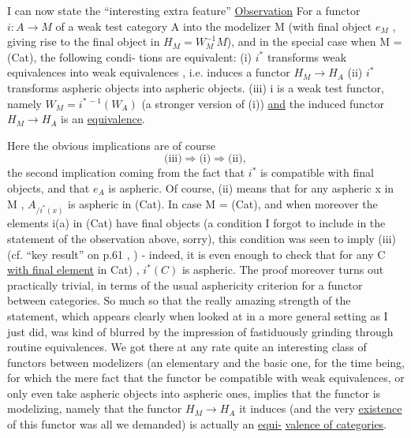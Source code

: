 
I can now state the ``interesting extra feature'' 
\uline{Observation} For a functor $i: A\to M$ of a weak test category A into the
modelizer M (with final object $e_M$ , giving rise to the final object in
$H_M = W_M^{-1}M$), and in the special case when M = (Cat), the following condi-%
tions are equivalent:
(i) $i^*$ transforms weak equivalences into weak equivalences , i.e.
induces a functor  $H_M\to H_{A\hat{}}$
(ii) $i^*$ transforms aspheric objects into aspheric objects.
(iii) i is a weak test functor, namely $W_M = i^{*\,-1}(W_{A\hat{}})$ (a stronger
version of (i)) \uline{and} the induced functor $H_M\to H_{A\hat{}}$ is an
\uline{equivalence}.

Here the obvious implications are of course
\[ \text{(iii)} \Longrightarrow \text{(i)} \Longrightarrow \text{(ii)} , \]
the second implic\hand{\unsure{$\smile$}}ation coming from the fact that $i^*$ is compatible with
final objects, and that $e_{A\hat{}}$ is aspheric. Of course, (ii) means that
for any aspheric x in M , $A_{/i^*(x)}$ is aspheric in (Cat). In case M =
(Cat), and when moreover the elements i(a) in (Cat) have final objects
(a condition I forgot to include in the statement of the observation
above, sorry), this condition was seen to imply (iii) (cf. ``key result''
on p.61 , ) - indeed, it is even enough to check that
 for any C \uline{with final element} in \hand{(}Cat) , $i^*(C)$ is aspheric. The proof
moreover turns out practically trivial, in terms of the usual asphericity
criterion for a functor between categories. So much so that the really
amazing strength of the statement, which appears clearly when looked at
in a more general setting\hand{\unsure{,}} as I just did, was kind of blurred by the
impression of  fastiduously grinding through routine equivalences. We got
\margin{||} there at any rate quite an interesting class of functors between modelizers
(an elementary and the basic one, for the time being\hand{)}, for which the
mere fact that the functor be compatible with weak equivalences, or only
even take aspheric objects into aspheric ones, implies that the functor
is modelizing, namely that the functor $H_M\to H_{A\hat{}}$ it induces (and the
very \uline{existence} of this functor was all we demanded) is actually an \uline{equi-}%
\uline{valence of categories}.

